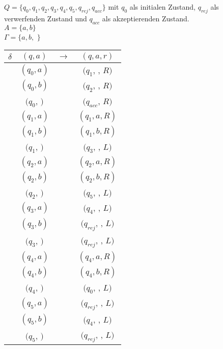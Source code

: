 \documentclass[12pt, a4paper]{article}
\begin{document}
\(Q = \{q_0, q_1, q_2, q_3, q_4, q_5, q_{rej}, q_{acc}\}\) mit \(q_0\) als initialen Zustand, 
\(q_{rej}\) als verwerfenden Zustand und \(q_{acc}\) als akzeptierenden Zustand.\\
\(A = \{a,b\}\)\\
\(\Gamma = \{a,b,\) \textvisiblespace\(\}\)\\
\begin{tabular}{c c c c}
    \(\delta\) & \((q, a)\) & \(\rightarrow\) & \((q, a, r)\)\\
    \hline
            &\((q_0, a)\)                       && \((q_1\), \textvisiblespace, \(R)\)\\
            &\((q_0, b)\)                       && \((q_2\), \textvisiblespace, \(R)\)\\
            &\((q_0\), \textvisiblespace\()\)   && \((q_{acc}\)\textvisiblespace, \(R)\)\\
            &\((q_1, a)\)                       && \((q_1, a, R)\)\\
            &\((q_1, b)\)                       && \((q_1, b, R)\)\\
            &\((q_1\), \textvisiblespace \()\)  && \((q_3\), \textvisiblespace, \(L)\)\\
            &\((q_2, a)\)                       && \((q_2, a, R)\)\\
            &\((q_2, b)\)                       && \((q_2, b, R)\)\\
            &\((q_2\), \textvisiblespace \()\)  && \((q_5\), \textvisiblespace, \(L)\)\\
            &\((q_3, a)\)                       && \((q_4\), \textvisiblespace, \(L)\)\\
            &\((q_3, b)\)                       && \((q_{rej}\), \textvisiblespace, \(L)\)\\
            &\((q_3\), \textvisiblespace \()\)  && \((q_{rej}\), \textvisiblespace, \(L)\)\\
            &\((q_4, a)\)                       && \((q_4, a, R)\)\\
            &\((q_4, b)\)                       && \((q_4, b, R)\)\\
            &\((q_4\), \textvisiblespace \()\)  && \((q_0\), \textvisiblespace, \(L)\)\\
            &\((q_5, a)\)                       && \((q_{rej}\), \textvisiblespace, \(L)\)\\
            &\((q_5, b)\)                       && \((q_4\), \textvisiblespace, \(L)\)\\
            &\((q_5\), \textvisiblespace \()\)  && \((q_{rej}\), \textvisiblespace, \(L)\)\\
\end{tabular}
\end{document}
